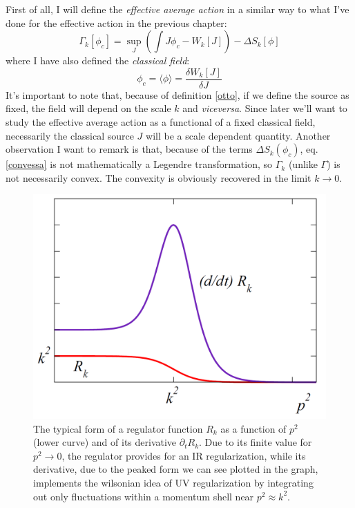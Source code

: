 First of all, I will define the \emph{effective average action} in a similar way to what I've done for the effective action in the previous chapter:
\begin{equation}\label{convessa}
 \Gamma_k[\phi_c] = \sup_J \left(\int J\phi_c - W_k[J]\right) - \Delta S_k[\phi]
\end{equation}
where I have also defined the \emph{classical field}:
\begin{equation}\label{otto}
 \phi_c = \langle \phi \rangle = \frac{\delta W_k[J]}{\delta J}
\end{equation}
It's important to note that, because of definition \eqref{otto}, if we define the source as fixed, the field will depend on the scale $k$ and 
\emph{viceversa}. Since later we'll want to study the effective average action as a functional of a fixed classical field, necessarily the classical
source $J$ will be a scale dependent quantity.
Another observation I want to remark is that, because of the terms $\Delta S_k(\phi_c)$, eq.\eqref{convessa} is not mathematically
a Legendre transformation, so $\Gamma_k$ (unlike $\Gamma$) is not necessarily convex. The convexity is obviously recovered in the limit $k\to0$.
\begin{figure}
\begin{center}
\includegraphics[scale=0.27]{Immagini/redrpunto.png}
\caption{The typical form of a regulator function $R_k$ as a function of $p^2$ (lower curve) and of its derivative $\partial_tR_k$. Due to its finite value for $p^2 \to 0$, the regulator provides for an IR regularization, while its derivative, due to the peaked form we can see plotted in the graph, implements the wilsonian idea of UV regularization by integrating out only fluctuations within a momentum shell near $p^2 \approx k^2$.}
\label{regolatore}
\end{center}
\end{figure}


